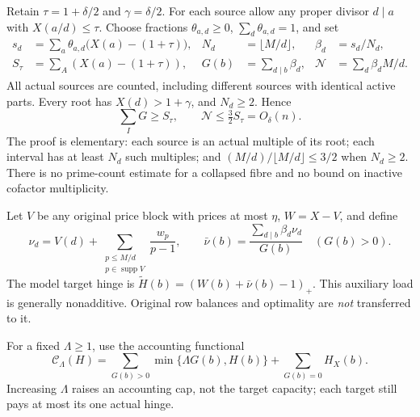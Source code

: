 \documentclass[11pt,a4paper]{article}
\newcommand{\pos}[1]{\left(#1\right)_+}
\begin{document}
Retain $\tau=1+\delta/2$ and $\gamma=\delta/2$. For each source allow any
proper divisor $d\mid a$ with $X(a/d)\le\tau$. Choose fractions
$\theta_{a,d}\ge0$, $\sum_d\theta_{a,d}=1$, and set
\begin{align*}
 s_d&=\sum_a\theta_{a,d}\bigl(X(a)-(1+\tau)\bigr),&
 N_d&=\lfloor M/d\rfloor,&\beta_d&=s_d/N_d,\\
 S_\tau&=\sum_A(X(a)-(1+\tau)),&
 G(b)&=\sum_{d\mid b}\beta_d,&
 \mathcal N&=\sum_d\beta_dM/d.
\end{align*}
All actual sources are counted, including different sources with identical
active parts. Every root has $X(d)>1+\gamma$, and $N_d\ge2$. Hence
\begin{equation}
 \sum_I G\ge S_\tau,
 \qquad \mathcal N\le\tfrac32S_\tau=O_\delta(n).          \label{norm}
\end{equation}
The proof is elementary: each source is an actual multiple of its root;
each interval has at least $N_d$ such multiples; and
$(M/d)/\lfloor M/d\rfloor\le3/2$ when $N_d\ge2$.
There is no prime-count estimate for a collapsed fibre and no bound on
inactive cofactor multiplicity.

Let $V$ be any original price block with prices at most $\eta$, $W=X-V$,
and define
\[
 \nu_d=V(d)+\sum_{\substack{p\le M/d\\p\in\operatorname{supp}V}}
                  \frac{w_p}{p-1},\qquad
 \bar\nu(b)=\frac{\sum_{d\mid b}\beta_d\nu_d}{G(b)}\quad(G(b)>0).
\]
The model target hinge is $\widetilde H(b)=\pos{W(b)+\bar\nu(b)-1}$.
This auxiliary load is generally nonadditive. Original row balances and
optimality are \emph{not} transferred to it.

For a fixed $\Lambda\ge1$, use the accounting functional
\begin{equation}
 \mathcal C_\Lambda(H)=
 \sum_{G(b)>0}\min\{\Lambda G(b),H(b)\}
 +\sum_{G(b)=0}H_X(b).                                  \label{account}
\end{equation}
Increasing $\Lambda$ raises an accounting cap, not the target capacity;
each target still pays at most its one actual hinge.
\end{document}
